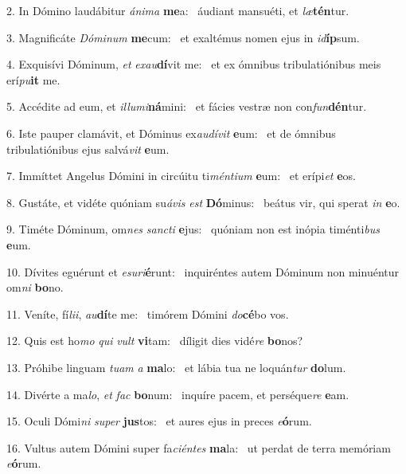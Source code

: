 2. In Dómino laudábitur \textit{á}\textit{ni}\textit{ma} \textbf{me}a: \ast\  áudiant mansuéti, et \textit{læ}\textbf{tén}tur.\

3. Magnificáte \textit{Dó}\textit{mi}\textit{num} \textbf{me}cum: \ast\  et exaltémus nomen ejus in \textit{id}\textbf{íp}sum.\

4. Exquisívi Dóminum, \textit{et} \textit{ex}\textit{au}\textbf{dí}vit me: \ast\  et ex ómnibus tribulatiónibus meis erí\textit{pu}\textbf{it} me.\

5. Accédite ad eum, et \textit{il}\textit{lu}\textit{mi}\textbf{ná}mini: \ast\  et fácies vestræ non con\textit{fun}\textbf{dén}tur.\

6. Iste pauper clamávit, et Dóminus ex\textit{au}\textit{dí}\textit{vit} \textbf{e}um: \ast\  et de ómnibus tribulatiónibus ejus salvá\textit{vit} \textbf{e}um.\

7. Immíttet Angelus Dómini in circúitu ti\textit{mén}\textit{ti}\textit{um} \textbf{e}um: \ast\  et erípi\textit{et} \textbf{e}os.\

8. Gustáte, et vidéte quóniam su\textit{á}\textit{vis} \textit{est} \textbf{Dó}minus: \ast\  beátus vir, qui sperat \textit{in} \textbf{e}o.\

9. Timéte Dóminum, om\textit{nes} \textit{sanc}\textit{ti} \textbf{e}jus: \ast\  quóniam non est inópia timénti\textit{bus} \textbf{e}um.\

10. Dívites eguérunt et \textit{e}\textit{su}\textit{ri}\textbf{é}runt: \ast\  inquiréntes autem Dóminum non minuéntur om\textit{ni} \textbf{bo}no.\

11. Veníte, fí\textit{li}\textit{i}, \textit{au}\textbf{dí}te me: \ast\  timórem Dómini \textit{do}\textbf{cé}bo vos.\

12. Quis est ho\textit{mo} \textit{qui} \textit{vult} \textbf{vi}tam: \ast\  díligit dies vidé\textit{re} \textbf{bo}nos?\

13. Próhibe linguam \textit{tu}\textit{am} \textit{a} \textbf{ma}lo: \ast\  et lábia tua ne loquán\textit{tur} \textbf{do}lum.\

14. Divérte a ma\textit{lo}, \textit{et} \textit{fac} \textbf{bo}num: \ast\  inquíre pacem, et perséque\textit{re} \textbf{e}am.\

15. Oculi Dómi\textit{ni} \textit{su}\textit{per} \textbf{jus}tos: \ast\  et aures ejus in preces \textit{e}\textbf{ó}rum.\

16. Vultus autem Dómini super fa\textit{ci}\textit{én}\textit{tes} \textbf{ma}la: \ast\  ut perdat de terra memóriam \textit{e}\textbf{ó}rum.\

